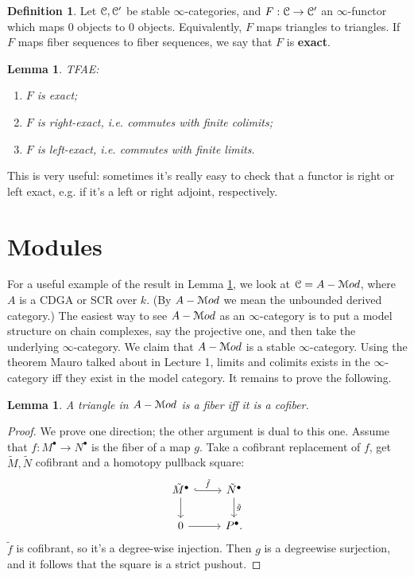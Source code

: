 \documentclass[10pt,a4paper,reqno,oneside]{book} %
\theoremstyle{plain}
\newtheorem{lem}[thm]{Lemma}
\theoremstyle{definition}
\newtheorem{defin}[thm]{Definition}
\theoremstyle{remark}
\numberwithin{equation}{section}
\begin{document}
\begin{defin}
Let $\mathcal C, \mathcal C'$ be stable $\infty$-categories, and $F: \mathcal C \to \mathcal C'$ an $\infty$-functor which maps 0 objects to 0 objects. 
Equivalently, $F$ maps triangles to triangles.
If $F$ maps fiber sequences to fiber sequences, we say that $F$ is \textbf{exact}.
\end{defin}

\begin{lem}
\label{lem:exact}
TFAE:
\begin{enumerate}
\item $F$ is exact;
\item $F$ is right-exact, i.e. commutes with finite colimits;
\item $F$ is left-exact, i.e. commutes with finite limits.
\end{enumerate}
\end{lem}

This is very useful: sometimes it's really easy to check that a functor is right or left exact, e.g. if it's a left or right
adjoint, respectively.


\section{Modules}
\label{sect:modules}

For a useful example of the result in Lemma \ref{lem:exact}, we look at $\mathcal C = A-\mathcal M od$, where $A$ is a CDGA or SCR over $k$.
(By $A-\mathcal M od$ we mean the unbounded derived category.) The easiest way
to see $A-\mathcal M od$ as an $\infty$-category is to put a model structure on chain complexes, say the projective one, and then
take the underlying $\infty$-category.
We claim that $A-\mathcal M od$ is a stable $\infty$-category. Using the theorem
Mauro talked about in Lecture 1, limits and colimits exists in the $\infty$-category iff they exist in the model category.
 It remains to prove the following.

\begin{lem}
A triangle in $A-\mathcal M od$ is a fiber iff it is a cofiber.
\end{lem}
\begin{proof}
We prove one direction; the other argument is dual to this one. Assume that $f:M^{\bullet} \to N^{\bullet}$ 
is the fiber of a map $g$. Take a cofibrant replacement of $f$, get $\tilde M, \tilde N$ cofibrant and a homotopy
pullback square:
\[
\begin{tikzcd}
\tilde M^{\bullet}\arrow[hook]{r}{\tilde f}\arrow{d} & \tilde N^{\bullet}\arrow{d}{\tilde g} \\
0\arrow{r}  & P^{\bullet} .
\end{tikzcd}
\]
$\tilde f$ is cofibrant, so it's a degree-wise injection. Then $g$ is a degreewise surjection, and it follows that the 
square is a strict pushout. 
\end{proof}
\end{document}
